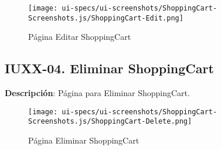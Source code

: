 \begin{figure}[H]
	\label{tab:ui-edit-shoppingcart-page}
	\texttt{[image: ui-specs/ui-screenshots/ShoppingCart-Screenshots.js/ShoppingCart-Edit.png]}
	\caption{P\'agina Editar ShoppingCart}
\end{figure}

\begin{table}[H]
	\caption{Forma Editar ShoppingCart}
	\label{tab:ui-update-shoppingcart-form}
\end{table}

\clearpage
\subsection{IUXX-04. Eliminar ShoppingCart} \label{sec:ui-page-delete-shoppingcart}

\textbf{Descripci\'on}: P\'agina para Eliminar ShoppingCart.\\

\begin{figure}[H]
	\label{tab:ui-delete-shoppingcart-page}
	\texttt{[image: ui-specs/ui-screenshots/ShoppingCart-Screenshots.js/ShoppingCart-Delete.png]}
	\caption{P\'agina Eliminar ShoppingCart}
\end{figure}

